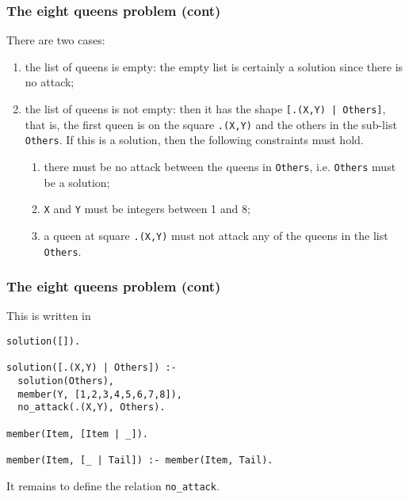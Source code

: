 %
\begin{frame}
\frametitle{The eight queens problem (cont)}

There are two cases:
\begin{enumerate}

  \item the list of queens is empty: the empty list is certainly a
    solution since there is no attack;

  \item the list of queens is not empty: then it has the shape
    \texttt{\small [.(X,Y) | Others]}, that is, the first queen is on
    the square \texttt{.(X,Y)} and the others in the sub-list
    \texttt{Others}. If this is a solution, then the following
    constraints must hold.
    \begin{enumerate}

      \item there must be no attack between the queens in
        \texttt{Others}, i.e. \texttt{Others} must be a solution;

      \item \texttt{X} and \texttt{Y} must be integers between 1 and
        8;

      \item a queen at square \texttt{.(X,Y)} must not attack any of
        the queens in the list \texttt{Others}.

    \end{enumerate}
    
\end{enumerate}

\end{frame}

%
\begin{frame}[containsverbatim]
\frametitle{The eight queens problem (cont)}

This is written in \Prolog
{\small
\begin{verbatim}
solution([]).

solution([.(X,Y) | Others]) :-
  solution(Others),
  member(Y, [1,2,3,4,5,6,7,8]),
  no_attack(.(X,Y), Others).

member(Item, [Item | _]).

member(Item, [_ | Tail]) :- member(Item, Tail).
\end{verbatim}
}
It remains to define the relation \texttt{no\_attack}.

\end{frame}

